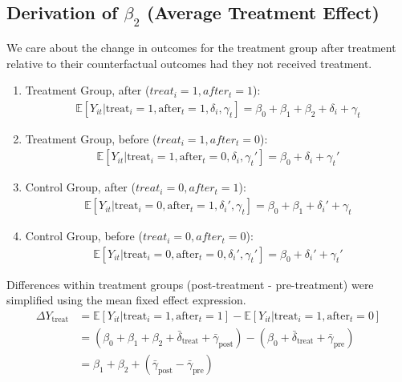 \subsection{Derivation of $\beta_2$ (Average Treatment Effect)}
We care about the change in outcomes for the treatment group after treatment relative to their counterfactual outcomes had they not received treatment.
\begin{enumerate}[label=(\alph*)]
    \item Treatment Group, after ($treat_i=1, after_t=1$):
    \begin{gather*}
        \mathbb{E}[Y_{it} | \text{treat}_i=1, \text{after}_t=1, \delta_i, \gamma_t] = \beta_0 + \beta_1 + \beta_2 + \delta_i + \gamma_t
    \end{gather*}
    \item Treatment Group, before ($treat_i=1, after_t=0$):
    \begin{gather*}
        \mathbb{E}[Y_{it} | \text{treat}_i=1, \text{after}_t=0, \delta_i, \gamma_t'] = \beta_0 + \delta_i + \gamma_t'
    \end{gather*}
    \item Control Group, after ($treat_i=0, after_t=1$):
    \begin{gather*}
        \mathbb{E}[Y_{it} | \text{treat}_i=0, \text{after}_t=1, \delta_i', \gamma_t] = \beta_0 + \beta_1 + \delta_i' + \gamma_t
    \end{gather*}
    \item Control Group, before ($treat_i=0, after_t=0$):
    \begin{gather*}
        \mathbb{E}[Y_{it} | \text{treat}_i=0, \text{after}_t=0, \delta_i', \gamma_t'] = \beta_0 + \delta_i' + \gamma_t'
    \end{gather*}
\end{enumerate}
Differences within treatment groups (post-treatment - pre-treatment) were simplified using the mean fixed effect expression.
\begin{align*}
    \Delta Y_{\text{treat}} &= \mathbb{E}[Y_{it} | \text{treat}_i=1, \text{after}_t=1] - \mathbb{E}[Y_{it} | \text{treat}_i=1, \text{after}_t=0] \\
    &= (\beta_0 + \beta_1 + \beta_2 + \bar{\delta}_{\text{treat}} + \bar{\gamma}_{\text{post}}) - (\beta_0 + \bar{\delta}_{\text{treat}} + \bar{\gamma}_{\text{pre}}) \\
    &= \beta_1 + \beta_2 + (\bar{\gamma}_{\text{post}} - \bar{\gamma}_{\text{pre}})
\end{align*}
